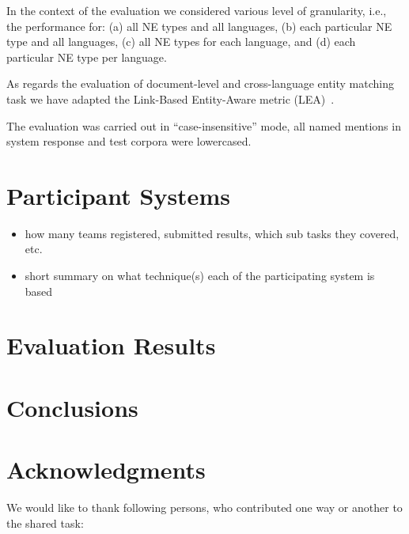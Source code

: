 \documentclass[11pt]{article}
\begin{document}
In the context of the evaluation we considered various level of granularity, i.e., the performance for: 
(a) all NE types and all languages, (b) each particular NE type and all languages, (c) all NE types for each language,
and (d) each particular NE type per language. 

As regards the evaluation of document-level and cross-language entity matching task we have adapted the 
Link-Based Entity-Aware metric (LEA)~\cite{DBLP:conf-acl-Moosavi016}.

The evaluation was carried out in ``case-insensitive'' mode, all named mentions in system response and test corpora were 
lowercased.


\section{Participant Systems}
\label{sec:participants}

\begin{itemize}

\item how many teams registered, submitted results, which sub tasks they covered, etc.

\item short summary on what technique(s) each of the participating system is based

\end{itemize}

\section{Evaluation Results}
\label{sec:results}


\section{Conclusions}
\label{sec:conclusions}


\section*{Acknowledgments}

We would like to thank following persons, who contributed one way or another to the shared task:



\end{document}

